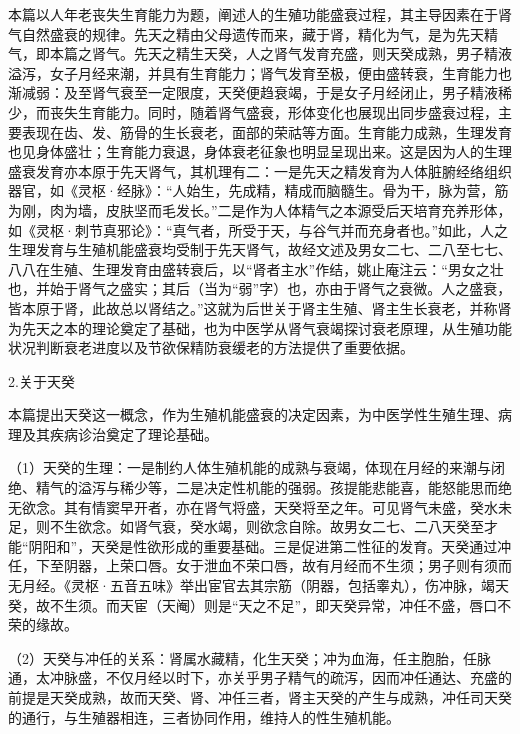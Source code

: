 \documentclass[draft,12pt]{ctexbook}
\begin{document}
本篇以人年老丧失生育能力为题，阐述人的生殖功能盛衰过程，其主导因素在于肾气自然盛衰的规律。先天之精由父母遗传而来，藏于肾，精化为气，是为先天精气，即本篇之肾气。先天之精生天癸，人之肾气发育充盛，则天癸成熟，男子精液溢泻，女子月经来潮，并具有生育能力；肾气发育至极，便由盛转衰，生育能力也渐减弱：及至肾气衰至一定限度，天癸便趋衰竭，于是女子月经闭止，男子精液稀少，而丧失生育能力。同时，随着肾气盛衰，形体变化也展现出同步盛衰过程，主要表现在齿、发、筋骨的生长衰老，面部的荣祜等方面。生育能力成熟，生理发育也见身体盛壮；生育能力衰退，身体衰老征象也明显呈现出来。这是因为人的生理盛衰发育亦本原于先天肾气，其机理有二：一是先天之精发育为人体脏腑经络组织器官，如《灵枢·经脉》：“人始生，先成精，精成而脑髓生。骨为干，脉为营，筋为刚，肉为墙，皮肤坚而毛发长。”二是作为人体精气之本源受后天培育充养形体，如《灵枢·刺节真邪论》：“真气者，所受于天，与谷气并而充身者也。”如此，人之生理发育与生殖机能盛衰均受制于先天肾气，故经文述及男女二七、二八至七七、八八在生殖、生理发育由盛转衰后，以“肾者主水”作结，姚止庵注云：“男女之壮也，并始于肾气之盛实；其后（当为“弱”字）也，亦由于肾气之衰微。人之盛衰，皆本原于肾，此故总以肾结之。”这就为后世关于肾主生殖、肾主生长衰老，并称肾为先天之本的理论奠定了基础，也为中医学从肾气衰竭探讨衰老原理，从生殖功能状况判断衰老进度以及节欲保精防衰缓老的方法提供了重要依据。

2.关于天癸

本篇提出天癸这一概念，作为生殖机能盛衰的决定因素，为中医学性生殖生理、病理及其疾病诊治奠定了理论基础。

（1）天癸的生理：一是制约人体生殖机能的成熟与衰竭，体现在月经的来潮与闭绝、精气的溢泻与稀少等，二是决定性机能的强弱。孩提能悲能喜，能怒能思而绝无欲念。其有情窦早开者，亦在肾气将盛，天癸将至之年。可见肾气未盛，癸水未足，则不生欲念。如肾气衰，癸水竭，则欲念自除。故男女二七、二八天癸至才能“阴阳和”，天癸是性欲形成的重要基础。三是促进第二性征的发育。天癸通过冲任，下至阴器，上荣口唇。女于泄血不荣口唇，故有月经而不生须；男子则有须而无月经。《灵枢·五音五味》举出宦官去其宗筋（阴器，包括睾丸），伤冲脉，竭天癸，故不生须。而天宦（天阉）则是“天之不足”，即天癸异常，冲任不盛，唇口不荣的缘故。

（2）天癸与冲任的关系：肾属水藏精，化生天癸；冲为血海，任主胞胎，任脉通，太冲脉盛，不仅月经以时下，亦关乎男子精气的疏泻，因而冲任通达、充盛的前提是天癸成熟，故而天癸、肾、冲任三者，肾主天癸的产生与成熟，冲任司天癸的通行，与生殖器相连，三者协同作用，维持人的性生殖机能。


\end{document}
